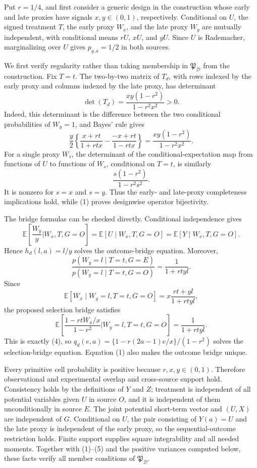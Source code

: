 Put \(r=1/4\), and first consider a generic design in the construction whose early and late proxies have signals \(x,y\in(0,1)\), respectively.  Conditional on \(U\), the signed treatment \(T\), the early proxy \(W_x\), and the late proxy \(W_y\) are mutually independent, with conditional means \(rU\), \(xU\), and \(yU\).  Since \(U\) is Rademacher, marginalizing over \(U\) gives \(p_{g,a}=1/2\) in both sources.

We first verify regularity rather than taking membership in \(\mathfrak P_{\mathcal D}\) from the construction.  Fix \(T=t\).  The two-by-two matrix of \(T_d\), with rows indexed by the early proxy and columns indexed by the late proxy, has determinant
\[
 \det(T_d)=\frac{xy(1-r^2)}{1-r^2x^2}>0. \tag{1}
\]
Indeed, this determinant is the difference between the two conditional probabilities of \(W_y=1\), and Bayes' rule gives
\[
 \frac y2\left\{
 \frac{x+rt}{1+rtx}-\frac{-x+rt}{1-rtx}
 \right\}
 =\frac{xy(1-r^2)}{1-r^2x^2}.
\]
For a single proxy \(W_s\), the determinant of the conditional-expectation map from functions of \(U\) to functions of \(W_s\), conditional on \(T=t\), is similarly
\[
 \frac{s(1-r^2)}{1-r^2s^2}. \tag{2}
\]
It is nonzero for \(s=x\) and \(s=y\).  Thus the early- and late-proxy completeness implications hold, while (1) proves designwise operator bijectivity.

The bridge formulas can be checked directly.  Conditional independence gives
\[
 \mathbb E\!\left[\frac{W_y}{y}\mathrel{\Big|}W_x,T,G=O\right]
 =\mathbb E[U\mid W_x,T,G=O]
 =\mathbb E[Y\mid W_x,T,G=O]. \tag{3}
\]
Hence \(h_d(l,a)=l/y\) solves the outcome-bridge equation.  Moreover,
\[
 \frac{p(W_y=l\mid T=t,G=E)}{p(W_y=l\mid T=t,G=O)}
 =\frac1{1+rtyl}. \tag{4}
\]
Since
\[
 \mathbb E[W_x\mid W_y=l,T=t,G=O]
 =x\frac{rt+yl}{1+rtyl},
\]
the proposed selection bridge satisfies
\[
 \mathbb E\!\left[
 \frac{1-rtW_x/x}{1-r^2}\mathrel{\Big|}W_y=l,T=t,G=O
 \right]
 =\frac1{1+rtyl}. \tag{5}
\]
This is exactly (4), so \(q_d(e,a)=\{1-r(2a-1)e/x\}/(1-r^2)\) solves the selection-bridge equation.  Equation (1) also makes the outcome bridge unique.

Every primitive cell probability is positive because \(r,x,y\in(0,1)\).  Therefore observational and experimental overlap and cross-source support hold.  Consistency holds by the definitions of \(Y\) and \(Z\); treatment is independent of all potential variables given \(U\) in source \(O\), and it is independent of them unconditionally in source \(E\).  The joint potential short-term vector and \((U,X)\) are independent of \(G\).  Conditional on \(U\), the pair consisting of \(Y(a)=U\) and the late proxy is independent of the early proxy, so the sequential-outcome restriction holds.  Finite support supplies square integrability and all needed moments.  Together with (1)--(5) and the positive variances computed below, these facts verify all member conditions of \(\mathfrak P_{\mathcal D}\).

